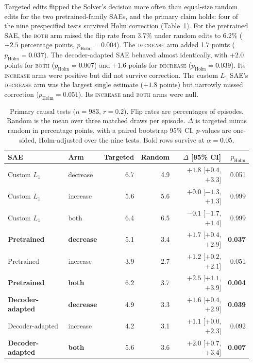 Targeted edits flipped the Solver's decision more often than equal-size
random edits for the two pretrained-family SAEs, and the primary claim holds:
four of the nine prespecified tests survived Holm correction
(Table~\ref{tab:primary-causal}). For the pretrained SAE, the \textsc{both}
arm raised the flip rate from 3.7\% under random edits to 6.2\% ($+2.5$
percentage points, $p_{\mathrm{Holm}}=0.004$). The \textsc{decrease} arm
added 1.7 points ($p_{\mathrm{Holm}}=0.037$). The decoder-adapted SAE
behaved almost identically, with $+2.0$ points for \textsc{both}
($p_{\mathrm{Holm}}=0.007$) and $+1.6$ points for \textsc{decrease}
($p_{\mathrm{Holm}}=0.039$). Its \textsc{increase} arms were positive but did
not survive correction. The custom $L_1$ SAE's \textsc{decrease} arm was the
largest single estimate ($+1.8$ points) but narrowly missed correction
($p_{\mathrm{Holm}}=0.051$). Its \textsc{increase} and \textsc{both} arms were
null.

\begin{table}[htbp]
    \centering
    \caption{Primary causal tests ($n=983$, $r=0.2$). Flip rates are
    percentages of episodes. Random is the mean over three matched draws per
    episode. $\Delta$ is targeted minus random in percentage points, with a
    paired bootstrap 95\% CI. $p$-values are one-sided, Holm-adjusted over the
    nine tests. Bold rows survive at $\alpha=0.05$.}
    \label{tab:primary-causal}
    \begin{tabular}{llrrrr}
        \toprule
        SAE & Arm & Targeted & Random & $\Delta$ [95\% CI] & $p_{\mathrm{Holm}}$ \\
        \midrule
        Custom $L_1$ & decrease & 6.7 & 4.9 & $+1.8$ [$+0.4$, $+3.3$] & 0.051 \\
        Custom $L_1$ & increase & 5.6 & 5.6 & $+0.0$ [$-1.3$, $+1.3$] & 0.999 \\
        Custom $L_1$ & both & 6.4 & 6.5 & $-0.1$ [$-1.7$, $+1.4$] & 0.999 \\
        \textbf{Pretrained} & \textbf{decrease} & 5.1 & 3.4 & $+1.7$ [$+0.4$, $+2.9$] & \textbf{0.037} \\
        Pretrained & increase & 3.9 & 2.7 & $+1.2$ [$+0.2$, $+2.1$] & 0.051 \\
        \textbf{Pretrained} & \textbf{both} & 6.2 & 3.7 & $+2.5$ [$+1.1$, $+3.9$] & \textbf{0.004} \\
        \textbf{Decoder-adapted} & \textbf{decrease} & 4.9 & 3.3 & $+1.6$ [$+0.4$, $+2.9$] & \textbf{0.039} \\
        Decoder-adapted & increase & 4.2 & 3.1 & $+1.1$ [$+0.0$, $+2.3$] & 0.092 \\
        \textbf{Decoder-adapted} & \textbf{both} & 5.6 & 3.6 & $+2.0$ [$+0.7$, $+3.4$] & \textbf{0.007} \\
        \bottomrule
    \end{tabular}
\end{table}

